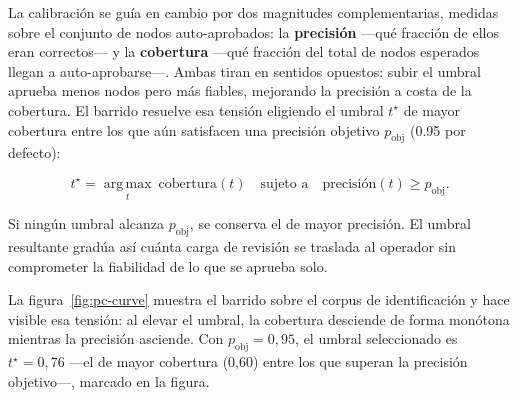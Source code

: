 La calibración se guía en cambio por dos magnitudes complementarias, medidas sobre el conjunto de
nodos auto-aprobados: la \textbf{precisión} —qué fracción de ellos eran correctos— y la
\textbf{cobertura} —qué fracción del total de nodos esperados llegan a auto-aprobarse—. Ambas
tiran en sentidos opuestos: subir el umbral aprueba menos nodos pero más fiables, mejorando la
precisión a costa de la cobertura. El barrido resuelve esa tensión eligiendo el umbral $t^\star$ de
mayor cobertura entre los que aún satisfacen una precisión objetivo $p_{\text{obj}}$ (0.95 por
defecto):

\begin{equation}
  t^\star = \operatorname*{arg\,max}_{t}\ \text{cobertura}(t)
  \quad\text{sujeto a}\quad
  \text{precisión}(t) \ge p_{\text{obj}}.
\end{equation}

Si ningún umbral alcanza $p_{\text{obj}}$, se conserva el de mayor precisión. El umbral resultante
gradúa así cuánta carga de revisión se traslada al operador sin comprometer la fiabilidad de lo que
se aprueba solo.

La figura~\ref{fig:pc-curve} muestra el barrido sobre el corpus de identificación y hace visible
esa tensión: al elevar el umbral, la cobertura desciende de forma monótona mientras la precisión
asciende. Con $p_{\text{obj}}=0{,}95$, el umbral seleccionado es $t^\star=0{,}76$ —el de mayor
cobertura (0,60) entre los que superan la precisión objetivo—, marcado en la figura.

